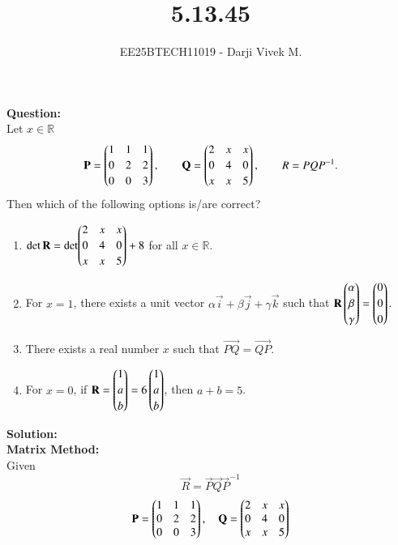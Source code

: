 \documentclass[journal]{IEEEtran}
\begin{document}


\title{5.13.45}
\author{EE25BTECH11019 - Darji Vivek M.}
{\let\newpage\relax\maketitle}

\renewcommand{\thefigure}{\theenumi}
\renewcommand{\thetable}{\theenumi}
\setlength{\intextsep}{10pt}
\renewcommand{\thetable}{\theenumi}

\textbf{Question:}\\
Let $x\in\mathbb R$
\[
\mathbf{P}=\begin{pmatrix}1 & 1 & 1\\[2pt] 0 & 2 & 2\\[2pt] 0 & 0 & 3\end{pmatrix},\qquad
\mathbf{Q}=\begin{pmatrix}2 & x & x\\[2pt] 0 & 4 & 0\\[2pt] x & x & 5\end{pmatrix},
\qquad R=PQP^{-1}.
\]
Then which of the following options is/are correct?\\[4pt]

\begin{enumerate}
\item $\det \mathbf{R}=\det\!\begin{pmatrix}2 & x & x\\[2pt]0 & 4 & 0\\[2pt]x & x & 5\end{pmatrix}+8$ for all $x\in\mathbb R$.
\item For $x=1$, there exists a unit vector $\alpha\vec{i}+\beta\vec{j}+\gamma\vec{k}$ such that $\mathbf{R}\begin{pmatrix}\alpha\\[2pt]\beta\\[2pt]\gamma\end{pmatrix}=\begin{pmatrix}0\\[2pt]0\\[2pt]0\end{pmatrix}$.
\item There exists a real number $x$ such that $\vec{PQ}=\vec{QP}$.
\item For $x=0$, if $\mathbf{R}=\begin{pmatrix}1\\[2pt]a\\[2pt]b\end{pmatrix}=6\begin{pmatrix}1\\[2pt]a\\[2pt]b\end{pmatrix}$, then $a+b=5$.
\end{enumerate}

\textbf{Solution:}\\[2pt]
\textbf{Matrix Method:}\\[-2mm]

Given
\[
\vec{R} = \vec{P}\vec{Q}\vec{P}^{-1}
\]
\[
\mathbf{P}=\begin{pmatrix}1 & 1 & 1\\ 0 & 2 & 2\\ 0 & 0 & 3\end{pmatrix}, \quad
\mathbf{Q}=\begin{pmatrix}2 & x & x\\ 0 & 4 & 0\\ x & x & 5\end{pmatrix}
\]
\end{document}
